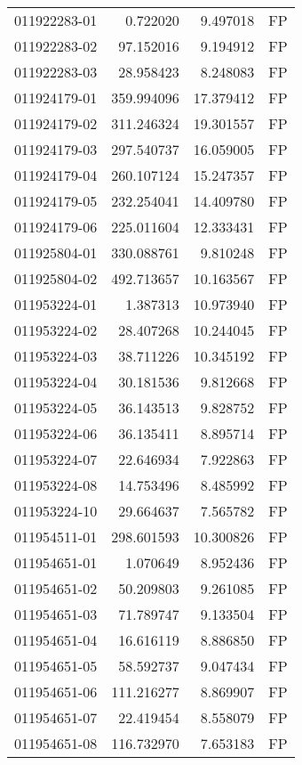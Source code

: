 \begin{tabular}{lrrl}
011922283-01 &    0.722020 &     9.497018 &   FP \\
011922283-02 &   97.152016 &     9.194912 &   FP \\
011922283-03 &   28.958423 &     8.248083 &   FP \\
011924179-01 &  359.994096 &    17.379412 &   FP \\
011924179-02 &  311.246324 &    19.301557 &   FP \\
011924179-03 &  297.540737 &    16.059005 &   FP \\
011924179-04 &  260.107124 &    15.247357 &   FP \\
011924179-05 &  232.254041 &    14.409780 &   FP \\
011924179-06 &  225.011604 &    12.333431 &   FP \\
011925804-01 &  330.088761 &     9.810248 &   FP \\
011925804-02 &  492.713657 &    10.163567 &   FP \\
011953224-01 &    1.387313 &    10.973940 &   FP \\
011953224-02 &   28.407268 &    10.244045 &   FP \\
011953224-03 &   38.711226 &    10.345192 &   FP \\
011953224-04 &   30.181536 &     9.812668 &   FP \\
011953224-05 &   36.143513 &     9.828752 &   FP \\
011953224-06 &   36.135411 &     8.895714 &   FP \\
011953224-07 &   22.646934 &     7.922863 &   FP \\
011953224-08 &   14.753496 &     8.485992 &   FP \\
011953224-10 &   29.664637 &     7.565782 &   FP \\
011954511-01 &  298.601593 &    10.300826 &   FP \\
011954651-01 &    1.070649 &     8.952436 &   FP \\
011954651-02 &   50.209803 &     9.261085 &   FP \\
011954651-03 &   71.789747 &     9.133504 &   FP \\
011954651-04 &   16.616119 &     8.886850 &   FP \\
011954651-05 &   58.592737 &     9.047434 &   FP \\
011954651-06 &  111.216277 &     8.869907 &   FP \\
011954651-07 &   22.419454 &     8.558079 &   FP \\
011954651-08 &  116.732970 &     7.653183 &   FP \\

\end{tabular}
